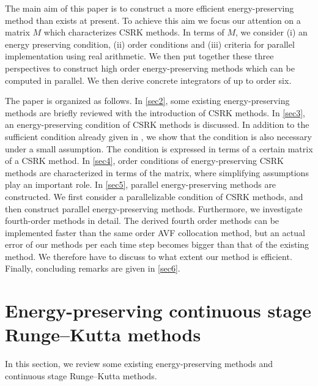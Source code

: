 \documentclass[final,leqno,onefignum,onetabnum]{siamltex1213}
\begin{document}
The main aim of this paper is to construct a more efficient 
energy-preserving method than exists at present.
To achieve this aim we focus our attention on a matrix $M$ which
characterizes CSRK methods. 
In terms of $M$,  we consider (i) an energy preserving condition,
(ii) order conditions and (iii) criteria for parallel implementation using real arithmetic.
We then put together these three perspectives to construct high order
energy-preserving methods which can be computed in parallel.
We then derive concrete integrators of up to order six.

The paper is organized as follows.
In \autoref{sec2}, some existing energy-preserving methods are briefly reviewed
with the introduction of CSRK methods.
In \autoref{sec3}, 
an energy-preserving condition of CSRK methods is discussed.
In addition to the sufficient condition already given in \cite{mi14}, 
we show that the condition is also necessary under a small assumption.
The condition is expressed in terms of a certain matrix of a CSRK method.
In \autoref{sec4},
order conditions of energy-preserving CSRK methods are characterized
in terms of the matrix, where simplifying assumptions play an important role.
In \autoref{sec5},
parallel energy-preserving methods are constructed.
We first consider a parallelizable condition of CSRK methods,
and then construct parallel energy-preserving methods.
Furthermore, we investigate fourth-order methods in detail.
The derived fourth order methods can be implemented faster
than the same order AVF collocation method,
but an actual error of our methods per each time step becomes bigger
than that of the existing method.
We therefore have to discuss to what extent our method is efficient.
Finally, concluding remarks are given in \autoref{sec6}.

\section{Energy-preserving continuous stage Runge--Kutta methods}
\label{sec2}
In this section,
we review some existing energy-preserving methods
and continuous stage Runge--Kutta methods.
\end{document}
